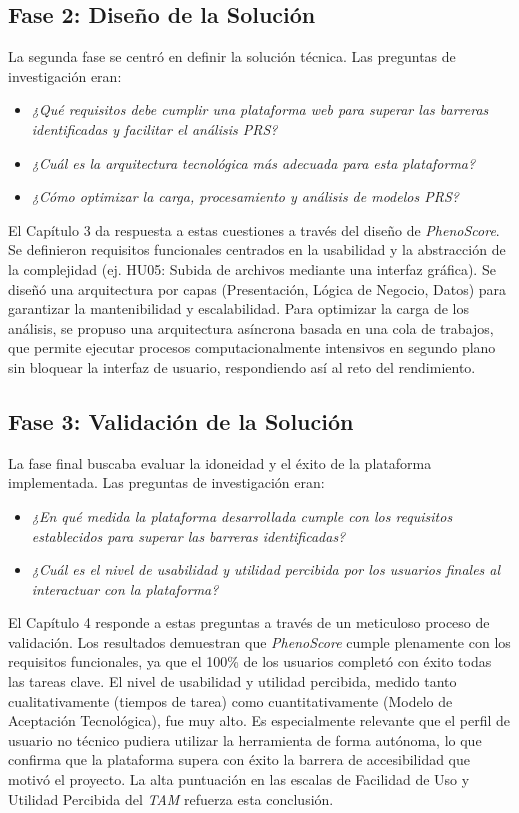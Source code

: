 \subsection{Fase 2: Diseño de la Solución}

La segunda fase se centró en definir la solución técnica. Las preguntas de investigación eran:

\begin{itemize}
    \item \textit{¿Qué requisitos debe cumplir una plataforma web para superar las barreras identificadas y facilitar el análisis PRS?}
    \item \textit{¿Cuál es la arquitectura tecnológica más adecuada para esta plataforma?}
    \item \textit{¿Cómo optimizar la carga, procesamiento y análisis de modelos PRS?}
\end{itemize}

El Capítulo 3 da respuesta a estas cuestiones a través del diseño de \textit{PhenoScore}. Se definieron requisitos funcionales centrados en la usabilidad y la abstracción de la complejidad (ej. HU05: Subida de archivos mediante una interfaz gráfica). Se diseñó una arquitectura por capas (Presentación, Lógica de Negocio, Datos) para garantizar la mantenibilidad y escalabilidad. Para optimizar la carga de los análisis, se propuso una arquitectura asíncrona basada en una cola de trabajos, que permite ejecutar procesos computacionalmente intensivos en segundo plano sin bloquear la interfaz de usuario, respondiendo así al reto del rendimiento.

\subsection{Fase 3: Validación de la Solución}

La fase final buscaba evaluar la idoneidad y el éxito de la plataforma implementada. Las preguntas de investigación eran:

\begin{itemize}
    \item \textit{¿En qué medida la plataforma desarrollada cumple con los requisitos establecidos para superar las barreras identificadas?}
    \item \textit{¿Cuál es el nivel de usabilidad y utilidad percibida por los usuarios finales al interactuar con la plataforma?}
\end{itemize}

El Capítulo 4 responde a estas preguntas a través de un meticuloso proceso de validación. Los resultados demuestran que \textit{PhenoScore} cumple plenamente con los requisitos funcionales, ya que el 100\% de los usuarios completó con éxito todas las tareas clave. El nivel de usabilidad y utilidad percibida, medido tanto cualitativamente (tiempos de tarea) como cuantitativamente (Modelo de Aceptación Tecnológica), fue muy alto. Es especialmente relevante que el perfil de usuario no técnico pudiera utilizar la herramienta de forma autónoma, lo que confirma que la plataforma supera con éxito la barrera de accesibilidad que motivó el proyecto. La alta puntuación en las escalas de Facilidad de Uso y Utilidad Percibida del \textit{TAM} refuerza esta conclusión.

